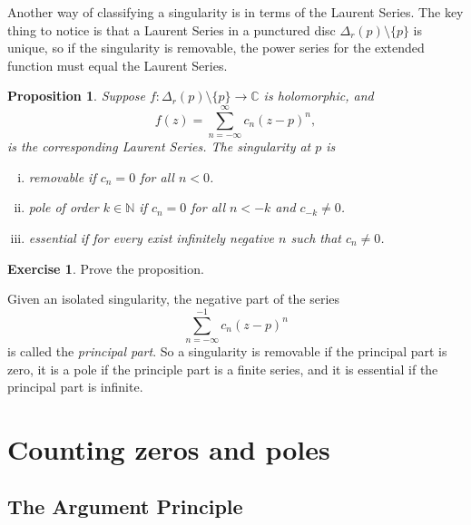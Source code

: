 \documentclass[12pt,openany]{book}
\newcommand{\C}{{\mathbb{C}}}
\newcommand{\N}{{\mathbb{N}}}
\newcommand{\myindex}[1]{#1\index{#1}}
\theoremstyle{plain}
\newtheorem{prop}[thm]{Proposition}
\theoremstyle{remark}
\theoremstyle{definition}
\newenvironment{exbox}{%
    \def\FrameCommand{\vrule width 1pt \relax\hspace {10pt}}%
    \MakeFramed {\advance \hsize -\width \FrameRestore }%
}{%
    \endMakeFramed
}
\theoremstyle{exercise}
\newtheorem{exercise}{Exercise}[section]
\theoremstyle{example}
\begin{document}
Another way of classifying a singularity is in terms of the Laurent Series.
The key thing to notice is that a Laurent Series in a punctured
disc $\Delta_r(p) \setminus \{p\}$ is unique, so if the singularity is
removable, the power
series for the extended function must equal the Laurent Series.

\begin{prop}
Suppose $f \colon \Delta_r(p) \setminus \{p\} \to \C$ is holomorphic,
and
\begin{equation*}
f(z) = \sum_{n=-\infty}^\infty c_n {(z-p)}^n ,
\end{equation*}
is the corresponding Laurent Series.
The singularity at $p$ is
\begin{enumerate}[(i)]
\item \emph{removable} if $c_n = 0$ for all $n < 0$.
\item \emph{pole} of order $k \in \N$ if $c_n = 0$ for all $n < -k$ and
$c_{-k}
\not= 0$.
\item \emph{essential} if for every exist infinitely negative $n$
such that $c_n \not= 0$.
\end{enumerate}
\end{prop}

\begin{exbox}
\begin{exercise}
Prove the proposition.
\end{exercise}
\end{exbox}

Given an isolated singularity, the negative part of the series
\begin{equation*}
\sum_{n=-\infty}^{-1} c_n {(z-p)}^n 
\end{equation*}
is called the \emph{\myindex{principal part}}.  So a singularity is
removable if the principal part is zero, it is a pole if the principle part
is a finite series, and it is essential if the principal part is infinite.


\section{Counting zeros and poles}

\subsection{The Argument Principle}
\end{document}
